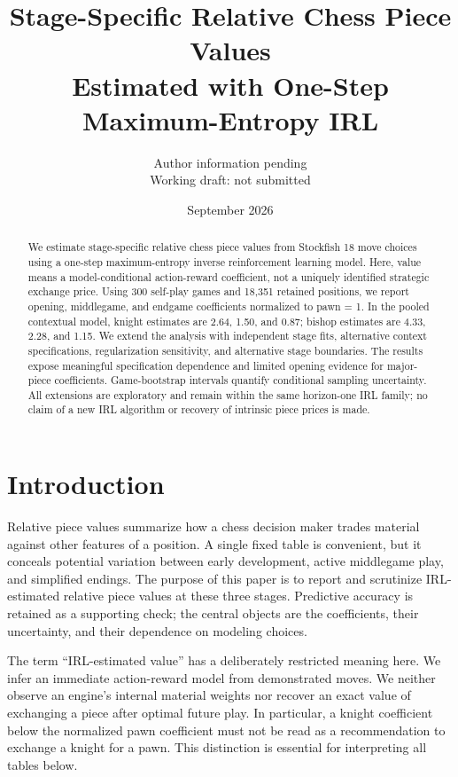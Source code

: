 \documentclass[11pt]{article}
\title{Stage-Specific Relative Chess Piece Values\\Estimated with One-Step Maximum-Entropy IRL}
\author{Author information pending\\\small Working draft: not submitted}
\date{September 2026}
\begin{document}
\maketitle
\begin{abstract}
We estimate stage-specific relative chess piece values from Stockfish 18 move choices using a one-step maximum-entropy inverse reinforcement learning model. Here, value means a model-conditional action-reward coefficient, not a uniquely identified strategic exchange price. Using 300 self-play games and 18,351 retained positions, we report opening, middlegame, and endgame coefficients normalized to pawn = 1. In the pooled contextual model, knight estimates are 2.64, 1.50, and 0.87; bishop estimates are 4.33, 2.28, and 1.15. We extend the analysis with independent stage fits, alternative context specifications, regularization sensitivity, and alternative stage boundaries. The results expose meaningful specification dependence and limited opening evidence for major-piece coefficients. Game-bootstrap intervals quantify conditional sampling uncertainty. All extensions are exploratory and remain within the same horizon-one IRL family; no claim of a new IRL algorithm or recovery of intrinsic piece prices is made.
\end{abstract}

\section{Introduction}
Relative piece values summarize how a chess decision maker trades material against other features of a position. A single fixed table is convenient, but it conceals potential variation between early development, active middlegame play, and simplified endings. The purpose of this paper is to report and scrutinize IRL-estimated relative piece values at these three stages. Predictive accuracy is retained as a supporting check; the central objects are the coefficients, their uncertainty, and their dependence on modeling choices.

The term ``IRL-estimated value'' has a deliberately restricted meaning here. We infer an immediate action-reward model from demonstrated moves. We neither observe an engine's internal material weights nor recover an exact value of exchanging a piece after optimal future play. In particular, a knight coefficient below the normalized pawn coefficient must not be read as a recommendation to exchange a knight for a pawn. This distinction is essential for interpreting all tables below.
\end{document}
